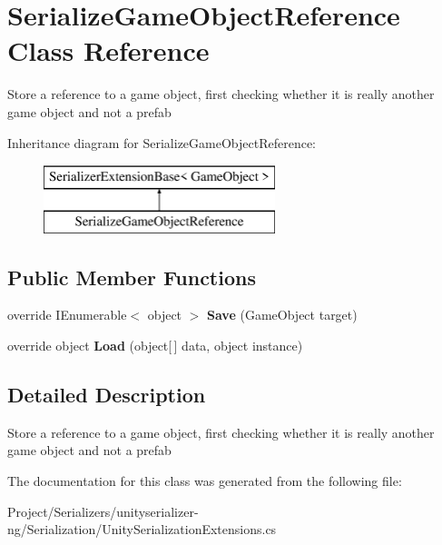 \hypertarget{class_serialize_game_object_reference}{}\section{Serialize\+Game\+Object\+Reference Class Reference}
\label{class_serialize_game_object_reference}


Store a reference to a game object, first checking whether it is really another game object and not a prefab  


Inheritance diagram for Serialize\+Game\+Object\+Reference\+:\begin{figure}[H]
\begin{center}
\leavevmode
\includegraphics[height=2.000000cm]{class_serialize_game_object_reference}
\end{center}
\end{figure}
\subsection*{Public Member Functions}
\begin{DoxyCompactItemize}
\item 
\mbox{\label{class_serialize_game_object_reference_a787a0671d47d542cd3df6f40c486d321}} 
override I\+Enumerable$<$ object $>$ {\bfseries Save} (Game\+Object target)
\item 
\mbox{\label{class_serialize_game_object_reference_a10255a41c68c84a3cc2495fb58fbc235}} 
override object {\bfseries Load} (object\mbox{[}$\,$\mbox{]} data, object instance)
\end{DoxyCompactItemize}


\subsection{Detailed Description}
Store a reference to a game object, first checking whether it is really another game object and not a prefab 



The documentation for this class was generated from the following file\+:\begin{DoxyCompactItemize}
\item 
Project/\+Serializers/unityserializer-\/ng/\+Serialization/Unity\+Serialization\+Extensions.\+cs\end{DoxyCompactItemize}
